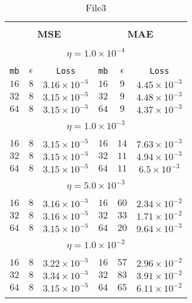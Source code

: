 \documentclass[10pt]{article}
\begin{document}
\begin{table}[]
  \small
  \caption{File3}\label{tab:tab1}
\begin{center}
\begin{tabular}{@{}ccc|ccc@{}}

\hline\\[-11pt]
\hline\\[-6.5pt]
\multicolumn{3}{c}{\bf MSE} & \multicolumn{3}{c}{\bf MAE } \\[5pt]
\hline\\[-11pt]
\multicolumn{6}{c}{$\eta = 1.0\times 10^{-4}$} \\[5pt]
\hline\\[-11pt]
\texttt{mb} & \texttt{$\epsilon$} & \texttt{Loss} & \texttt{mb} & \texttt{$\epsilon$} & \texttt{Loss} \\[1pt]
$16$ & $8$ & $3.16\times 10^{-5}$  & $16$ & $9$ & $4.45\times 10^{-3}$  \\ [1pt]
$32$ & $8$ & $3.15\times 10^{-5}$  & $32$ & $9$ & $4.48\times 10^{-3}$ \\ [1pt]
$64$ & $8$ & $3.15\times 10^{-5}$  & $64$ & $9$ & $4.37\times 10^{-3}$   \\[1pt]
\hline\\[-11pt]
\multicolumn{6}{c}{$\eta = 1.0\times 10^{-3}$} \\[5pt]
\hline\\[-11pt]
$16$ & $8$ & $3.15\times 10^{-5}$  & $16$ & $14$ & $7.63\times 10^{-3}$  \\ [1pt]
$32$ & $8$ & $3.15\times 10^{-5}$  & $32$ & $11$ & $4.94\times 10^{-3}$  \\ [1pt]
$64$ & $8$ & $3.15\times 10^{-5}$  & $64$ & $11$ & $6.5\times 10^{-3}$   \\ [1pt]
\hline\\[-11pt]
\multicolumn{6}{c}{$\eta = 5.0\times 10^{-3}$} \\[5pt]
\hline\\[-11pt]
$16$ & $8$ & $3.16\times 10^{-5}$  & $16$ & $60$ & $2.34\times 10^{-2}$  \\ [1pt]
$32$ & $8$ & $3.16\times 10^{-5}$  & $32$ & $33$ & $1.71\times 10^{-2}$  \\ [1pt]
$64$ & $8$ & $3.15\times 10^{-5}$  & $64$ & $20$ & $9.64\times 10^{-3}$  \\ [1pt]
\hline\\[-11pt]

\multicolumn{6}{c}{$\eta = 1.0\times 10^{-2}$} \\[5pt]
\hline\\[-11pt]
$16$ & $8$ & $3.22\times 10^{-5}$  & $16$ & $57$ & $2.96\times 10^{-2}$  \\ [1pt]
$32$ & $8$ & $3.34\times 10^{-5}$  & $32$ & $83$ & $3.91\times 10^{-2}$  \\ [1pt]
$64$ & $8$ & $3.15\times 10^{-5}$  & $64$ & $65$ & $6.11\times 10^{-2}$  \\ [1pt]
\hline\\[-11pt]


\end{tabular}
\end{center}
\end{table}
\end{document}
